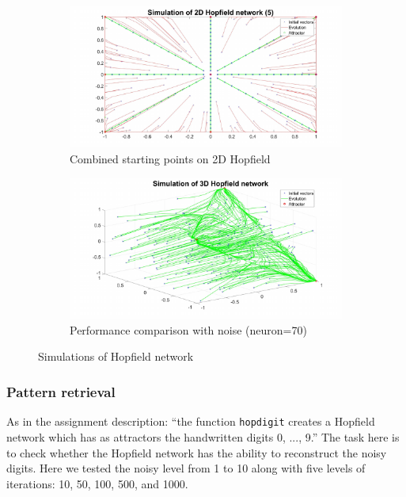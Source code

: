 \documentclass{article}
\begin{document}
\begin{figure}[h!]
\begin{subfigure}[b]{.49\textwidth}
  \centering
  \includegraphics[width=\linewidth]{lab2/2d5.pdf}
  \caption{Combined starting points on 2D Hopfield}
  \label{fig:2dcombined}
\end{subfigure}
\hfill
\begin{subfigure}[b]{.49\textwidth}
  \centering
  \includegraphics[width=\linewidth]{lab2/3d.pdf}
  \caption{Performance comparison with noise (neuron=70)}
  \label{fig:3dhop}
\end{subfigure}
\caption{Simulations of Hopfield network}
\label{fig:fig}
\end{figure}

\subsubsection{Pattern retrieval}

As in the assignment description: ``the function \verb|hopdigit| creates a Hopfield network which has as attractors the handwritten digits 0, ..., 9.'' The task here is to check whether the Hopfield network has the ability to reconstruct the noisy digits. Here we tested the noisy level from 1 to 10 along with five levels of iterations: 10, 50, 100, 500, and 1000. 
\end{document}
